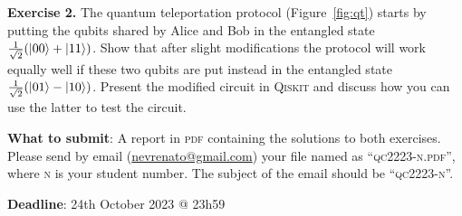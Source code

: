\documentclass[a4paper, 11pt]{article}
\theoremstyle{definition}
\begin{document}
\noindent
\textbf{Exercise 2.} The quantum teleportation protocol
(Figure~\ref{fig:qt}) starts by putting the qubits shared by Alice and
Bob in the entangled state $\frac{1}{\sqrt{2}}(\ket{00} + \ket{11})$.
Show that after slight modifications the protocol will work equally
well if these two qubits are put instead in the entangled state
$\frac{1}{\sqrt{2}}(\ket{01} - \ket{10})$. Present the modified
circuit in \textsc{Qiskit} and discuss how you can use the latter to test the
circuit.

\bigskip
\begin{mdframed}
\noindent
\textbf{What to submit}: A report in \textsc{pdf} containing the solutions to
both exercises. Please send by email (\underline{nevrenato@gmail.com}) your
file named as ``\textsc{qc2223-n.pdf}'', where \textsc{n} is your student
number. The subject of the email should be ``\textsc{qc2223-n}''.

\noindent
\textbf{Deadline}: 24th October 2023 @ 23h59
\end{mdframed}


\end{document}
